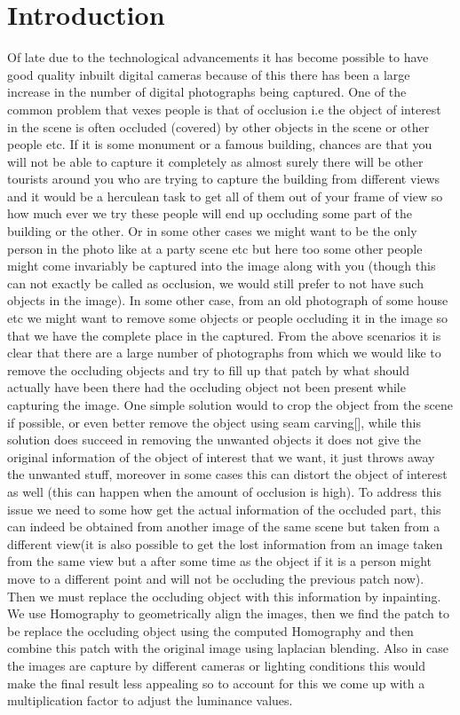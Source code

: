 \documentclass[conference]{IEEEtran}
\begin{document}
\section{Introduction}
	Of late due to the technological advancements it has become possible to have good quality inbuilt digital cameras because of this there has been a large increase in the number of digital photographs being captured. One of the common problem that vexes people is that of occlusion i.e the object of interest in the scene is often occluded (covered) by other objects in the scene or other people etc. If it is some monument or a famous building, chances are that you will not be able to capture it completely as almost surely there will be other tourists around you who are trying to capture the building from different views and it would be a herculean task to get all of them out of your frame of view so how much ever we try these people will end up occluding some part of the building or the other. Or in some other cases we might want to be the only person in the photo like at a party scene etc but here too some other people might come invariably be captured into the image along with you (though this can not exactly be called as occlusion, we would still prefer to not have such objects in the image). In some other case, from an old photograph of some house etc we might want to remove some objects or people occluding it in the image so that we have the complete place in the captured. 
	From the above scenarios it is clear that there are a large number of photographs from which we would like to remove the occluding objects and try to fill up that patch by what should actually have been there had the occluding object not been present while capturing the image. One simple solution would to crop the object from the scene if possible, or even better remove the object using seam carving[], while this solution does succeed in removing the unwanted objects it does not give the original information of the object of interest that we want, it just throws away the unwanted stuff, moreover in some cases this can distort the object of interest as well (this can happen when the amount of occlusion is high). To address this issue we need to some how get the actual information of the occluded part, this can indeed be obtained from another image of the same scene but taken from a different view(it is also possible to get the lost information from an image taken from the same view but a after some time as the object if it is a person might move to a different point and will not be occluding the previous patch now). Then we must replace the occluding object with this information by inpainting.
	We use Homography to geometrically align the images, then we find the patch to be replace the occluding object using the computed Homography and then combine this patch with the original image using laplacian blending. Also in case the images are capture by different cameras or lighting conditions this would make the final result less appealing so to account for this we come up with a multiplication factor to adjust the luminance values. 
\end{document}
